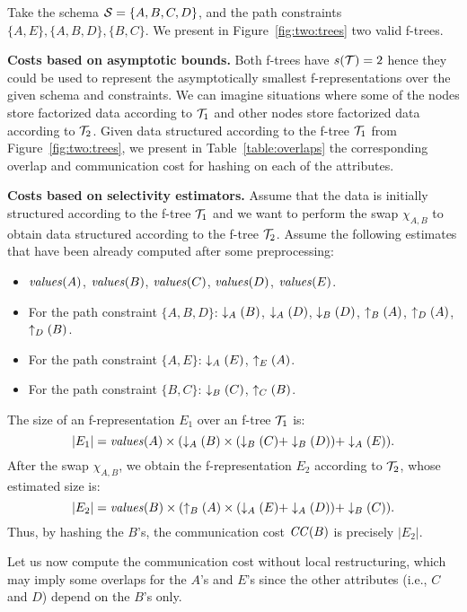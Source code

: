 \begin{example}\label{ex:two:trees}\normalfont
Take the schema $\S=\{A,B,C,D\}$, and the path constraints $\{A,E\}, \{A,B,D\}, \{B,C\}$.
We present in Figure~\ref{fig:two:trees} two valid f-trees.

{\bf Costs based on asymptotic bounds.}
Both f-trees have $s(\T)=2$ hence they could be used to represent the asymptotically smallest f-representations over the given schema and constraints.
We can imagine situations where some of the nodes store factorized data according to $\T_1$ and other nodes store factorized data according to $\T_2$.
Given data structured according to the f-tree $\T_1$ from Figure~\ref{fig:two:trees}, we present in Table~\ref{table:overlaps} the corresponding overlap and communication cost for hashing on each of the attributes.

{\bf Costs based on selectivity estimators.}
Assume that the data is initially structured according to the f-tree $\T_1$ and we want to perform the swap $\chi_{A,B}$ to obtain data structured according to the f-tree $\T_2$.
Assume the following estimates that have been already computed after some preprocessing:
\begin{itemize}
\item $\vals(A)$, $\vals(B)$, $\vals(C)$, $\vals(D)$, $\vals(E)$.
\item For the path constraint $\{A, B, D\}$: $\avgd_A(B)$, $\avgd_A(D)$, $\avgd_B(D)$, $\avgu_B(A)$, $\avgu_D(A)$, $\avgu_D(B)$.
\item For the path constraint $\{A, E\}$: $\avgd_A(E)$, $\avgu_E(A)$.
\item For the path constraint $\{B, C\}$: $\avgd_B(C)$, $\avgu_C(B)$.
\end{itemize}
The size of an f-representation $E_1$ over an f-tree $\T_1$ is:
\[
|E_1| = \vals(A) \times (\avgd_A(B)\times (\avgd_B(C) + \avgd_B(D)) +\avgd_A(E)).
\]
After the swap $\chi_{A,B}$, we obtain the f-representation $E_2$ according to $\T_2$, whose estimated size is:
\[
|E_2| = \vals(B) \times (\avgu_B(A)\times (\avgd_A(E) + \avgd_A(D)) + \avgd_B(C)).
\]
Thus, by hashing the $B$'s, the communication cost $\cc(B)$ is precisely $|E_2|$.

Let us now compute the communication cost without local restructuring, which may imply some overlaps for the $A$'s and $E$'s since the other attributes (i.e., $C$ and $D$) depend on the $B$'s only.


\end{example}
